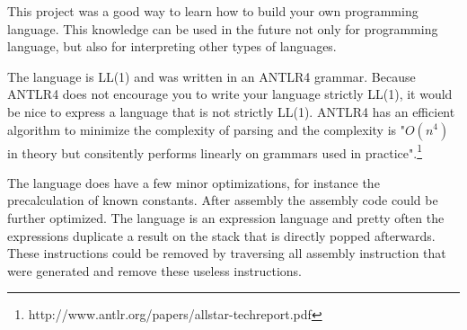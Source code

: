 This project was a good way to learn how to build your own programming language. This knowledge can be used in the future not only for programming language, but also for interpreting other types of languages.

The language is LL(1) and was written in an ANTLR4 grammar. Because ANTLR4 does not encourage you to write your language strictly LL(1), it would be nice to express a language that is not strictly LL(1). ANTLR4 has an efficient algorithm to minimize the complexity of parsing and the complexity is "$O(n^4)$ in theory but consitently performs linearly on grammars used in practice".\footnote{http://www.antlr.org/papers/allstar-techreport.pdf}

The language does have a few minor optimizations, for instance the precalculation of known constants. After assembly the assembly code could be further optimized. The language is an expression language and pretty often the expressions duplicate a result on the stack that is directly popped afterwards. These instructions could be removed by traversing all assembly instruction that were generated and remove these useless instructions.


